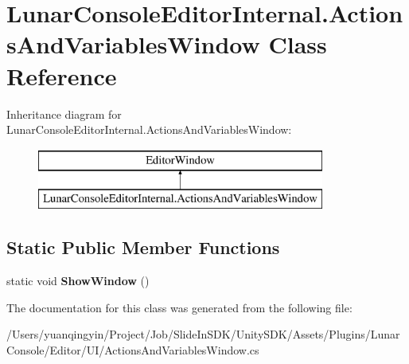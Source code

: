 \hypertarget{class_lunar_console_editor_internal_1_1_actions_and_variables_window}{}\section{Lunar\+Console\+Editor\+Internal.\+Actions\+And\+Variables\+Window Class Reference}
\label{class_lunar_console_editor_internal_1_1_actions_and_variables_window}
Inheritance diagram for Lunar\+Console\+Editor\+Internal.\+Actions\+And\+Variables\+Window\+:\begin{figure}[H]
\begin{center}
\leavevmode
\includegraphics[height=2.000000cm]{class_lunar_console_editor_internal_1_1_actions_and_variables_window}
\end{center}
\end{figure}
\subsection*{Static Public Member Functions}
\begin{DoxyCompactItemize}
\item 
\mbox{\label{class_lunar_console_editor_internal_1_1_actions_and_variables_window_afb45b36f8dd950717e455bd57f660254}} 
static void {\bfseries Show\+Window} ()
\end{DoxyCompactItemize}


The documentation for this class was generated from the following file\+:\begin{DoxyCompactItemize}
\item 
/\+Users/yuanqingyin/\+Project/\+Job/\+Slide\+In\+S\+D\+K/\+Unity\+S\+D\+K/\+Assets/\+Plugins/\+Lunar\+Console/\+Editor/\+U\+I/Actions\+And\+Variables\+Window.\+cs\end{DoxyCompactItemize}
